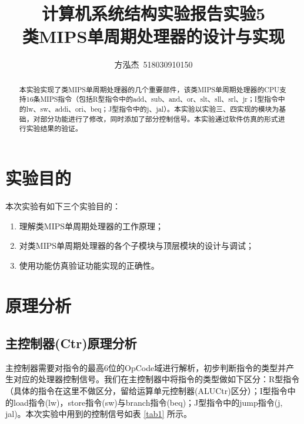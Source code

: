 \documentclass{cumcm}
\title{\textbf{计算机系统结构实验报告\quad 实验5}\\{\Large 类MIPS单周期处理器的设计与实现}}
\author{方泓杰\ 518030910150}
\numberwithin{equation}{section}
\numberwithin{equation}{subsection}
\begin{document}
\maketitle

\begin{abstract}
  本实验实现了类MIPS单周期处理器的几个重要部件，该类MIPS单周期处理器的CPU支持16条MIPS指令（包括R型指令中的add、sub、and、or、slt、sll、srl、jr；I型指令中的lw、sw、addi、ori、beq；J型指令中的j、jal）。本实验以实验三、四实现的模块为基础，对部分功能进行了修改，同时添加了部分控制信号。本实验通过软件仿真的形式进行实验结果的验证。
\end{abstract}

\maketitle \tableofcontents
\newpage

\section{实验目的}\label{section1}
本次实验有如下三个实验目的：
\begin{enumerate}
    \item 理解类MIPS单周期处理器的工作原理；
    \item 对类MIPS单周期处理器的各个子模块与顶层模块的设计与调试；
    \item 使用功能仿真验证功能实现的正确性。
\end{enumerate}

\section{原理分析}\label{section2}

\subsection{主控制器(Ctr)原理分析}\label{section2.1}
主控制器需要对指令的最高6位的OpCode域进行解析，初步判断指令的类型并产生对应的处理器控制信号。我们在主控制器中将指令的类型做如下区分：R型指令（具体的指令在这里不做区分，留给运算单元控制器(ALUCtr)区分）；I型指令中的load指令(lw)，store指令(sw)与branch指令(beq)；J型指令中的jump指令(j, jal)。本次实验中用到的控制信号如表 \ref{tab1} 所示。
\end{document}
